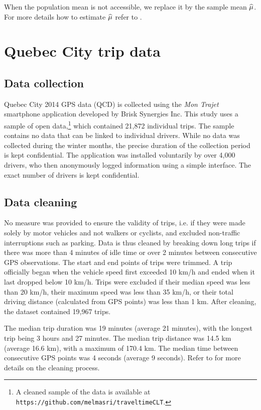 \documentclass[12pt]{article}
\begin{document}
{{{{{{When the population mean is not accessible, we replace it by the sample mean ${\widehat \mu}$. For more details how to estimate ${\widehat \mu}$ refer to \cite[Sec.~3.3.2]{elmasri2020predictive}. 


\section{Quebec City trip data} \label{sec:data}
\subsection{Data collection}
Quebec City 2014 GPS data (QCD) is collected using the \textit{Mon Trajet} smartphone application developed by Brisk Synergies Inc. This study uses a sample of open data,\footnote{{A cleaned sample of the data is available at \texttt{https://github.com/melmasri/traveltimeCLT}}.} which contained 21,872 individual trips. The sample contains no data that can be linked to individual drivers. While no data was collected during the winter months, the precise duration of the collection period is kept confidential. {The application was installed voluntarily by over 4,000 drivers, who then anonymously logged information using a simple interface. The exact number of drivers is kept confidential.}
\subsection{Data cleaning}
No measure was provided to ensure the validity of trips, i.e. if they were made solely by motor vehicles and not walkers or cyclists, and excluded non-traffic interruptions such as parking. Data is thus cleaned by breaking down long trips if there was more than 4 minutes of idle time or over 2 minutes between consecutive GPS observations. The start and end points of trips were trimmed. A trip officially began when the vehicle speed first exceeded 10 km/h and ended when it last dropped below 10 km/h. Trips were excluded if their median speed was less than 20 km/h, their maximum speed was less than 35 km/h, or their total driving distance (calculated from GPS points) was less than 1 km. After cleaning, the dataset contained 19,967 trips. 

The median trip duration was 19 minutes (average 21 minutes), with the longest trip being 3 hours and 27 minutes. The median trip distance was 14.5 km (average 16.6 km), with a maximum of 170.4 km. The median time between consecutive GPS points was 4 seconds (average 9 seconds). Refer to \cite[Sec.6.3] {elmasri2020predictive} for more details on the cleaning process. 

}}}}}}
\end{document}
